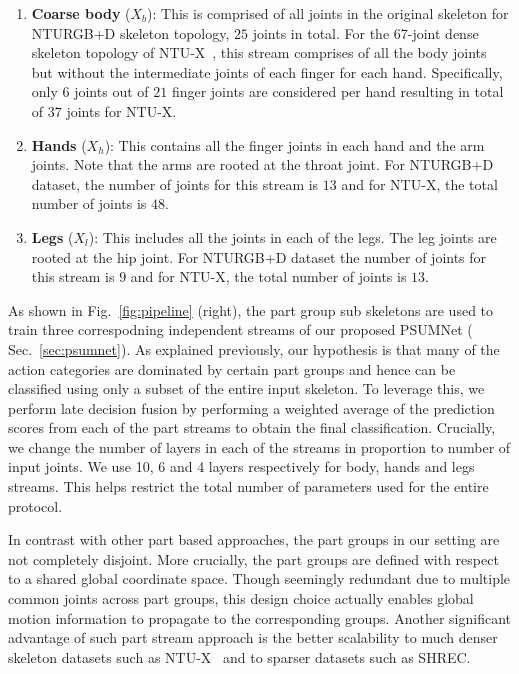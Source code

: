 \documentclass[runningheads]{llncs}
\begin{document}
\begin{enumerate}
    \item \textbf{Coarse body} ($X_b$): This is comprised of all joints in the original skeleton for NTURGB+D skeleton topology, $25$ joints in total. For the 67-joint dense skeleton topology of NTU-X~\cite{trivedi2021ntux}, this stream comprises of all the body joints but without the intermediate joints of each finger for each hand. Specifically, only $6$ joints out of $21$ finger joints are considered per hand resulting in total of $37$ joints for NTU-X.
    \item \textbf{Hands} ($X_{h}$): This contains all the finger joints in each hand and the arm joints. Note that the arms are rooted at the throat joint. For NTURGB+D dataset, the number of joints for this stream is $13$ and for NTU-X, the total number of joints is $48$. 
    \item \textbf{Legs} ($X_{l}$): This includes all the joints in each of the legs. The leg joints are rooted at the hip joint. For NTURGB+D dataset the number of joints for this stream is $9$ and for NTU-X, the total number of joints is $13$.
\end{enumerate}

As shown in Fig.~\ref{fig:pipeline} (right), the part group sub skeletons are used to train three correspodning independent streams of our proposed PSUMNet ( Sec.~\ref{sec:psumnet}). As explained previously, our hypothesis is that many of the action categories are dominated by certain part groups and hence can be classified using only a subset of the entire input skeleton. To leverage this, we perform late decision fusion by performing a weighted average of the prediction scores from each of the part streams to obtain  the final classification. Crucially, we change the number of layers in each of the streams in proportion to number of input joints. We use 10, 6 and 4 layers respectively for body, hands and legs streams. This helps restrict the total number of parameters used for the entire protocol. 

In contrast with other part based approaches, the part groups in our setting are not completely disjoint. More crucially, the part groups are defined with respect to a shared global coordinate space. Though seemingly redundant due to multiple common joints across part groups, this design choice actually enables global motion information to propagate to the corresponding groups. Another significant advantage of such part stream approach is the better scalability to much denser skeleton datasets such as NTU-X~\cite{trivedi2021ntux} and to sparser  datasets such as SHREC\cite{de20173d}.
\end{document}
